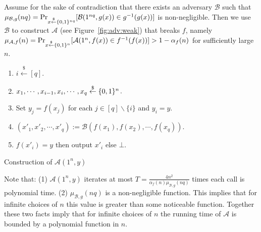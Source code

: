 \documentclass[12pt]{tufte-book}
\begin{document}
Assume for the sake of contradiction that there exists an adversary $\mathcal{B}$ such that $\mu_{\mathcal{B},g}(nq) = \Pr_{x \stackrel{\$}{\leftarrow} \{0,1\}^{nq}}[ \mathcal{B}(1^{nq}, g(x)) \in g^{-1}(g(x))]$ is non-negligible.
Then we use $\mathcal{B}$ to construct $\mathcal{A}$ (see Figure~\ref{fig:adv:weak}) that breaks $f$, namely $\mu_{\mathcal{A},f}(n) = \Pr_{x \stackrel{\$}{\leftarrow} \{0,1\}^{n}}[ \mathcal{A}(1^n, f(x)) \in f^{-1}(f(x))] > 1 - \alpha_f(n)$ for sufficiently large $n$.
\begin{marginfigure}[-5cm]
\begin{enumerate}
    \item $i \stackrel{\$}{\leftarrow} [q]$.
    \item $x_1, \cdots, x_{i-1}, x_i, \cdots, x_q \stackrel{\$}{\leftarrow} \{0,1\}^{n}$.
    \item Set $y_j = f(x_j)$ for each $j \in [q]\backslash \{i\}$ and $y_i = y$.
    \item $(x'_1, x'_2, \cdots, x'_q) := \mathcal{B} (f(x_1), f(x_2), \cdots, f(x_q))$.
    \item {$f(x'_i) = y$} then output $x'_i$ else $\bot$.
\end{enumerate}
\caption{Construction of $\mathcal{A}(1^n, y)$}
\label{fig:adv:weak}
\end{marginfigure}

Note that: (1) $\mathcal{A}(1^n, y)$ iterates at most $T = \frac{4n^2}{\alpha_f(n)\mu_{\mathcal{B},g}(nq)}$ times each call is polynomial time. (2) $\mu_{\mathcal{B},g}(nq)$ is a non-negligible function. This implies that for infinite choices of $n$ this value is greater than some noticeable function. Together these two facts imply that for infinite choices of $n$ the running time of $\mathcal{A}$ is bounded by a polynomial function in $n$.
\end{document}
